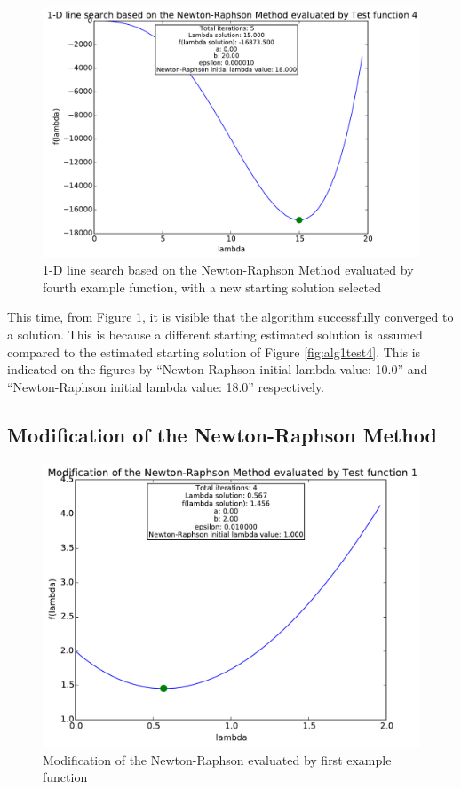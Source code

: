 \documentclass[a4paper,10pt]{article}
\begin{document}
\newpage
\begin{figure}[h]
\centering
 \includegraphics[scale=0.55]{./graphs/algorithm1/x90percentofb/testFunction4.pdf} 
 \caption{1-D line search based on the Newton-Raphson Method evaluated by fourth example function, with a new starting solution selected}
 \label{fig:alg1test4B}
\end{figure}

This time, from Figure \ref{fig:alg1test4B}, it is visible that the algorithm successfully converged to a solution. This is because a different starting estimated solution is assumed compared to the estimated starting solution of Figure \ref{fig:alg1test4}. This is indicated on the figures by ``Newton-Raphson initial lambda value: 10.0'' and ``Newton-Raphson initial lambda value: 18.0'' respectively.

\newpage
\subsection{Modification of the Newton-Raphson Method}
\begin{figure}[h]
\centering
 \includegraphics[scale=0.55]{./graphs/algorithm2/x_in_middel/testFunction1.pdf} 
 \caption{Modification of the Newton-Raphson evaluated by first example function}
 \label{fig:alg2test1}
\end{figure}
\end{document}
